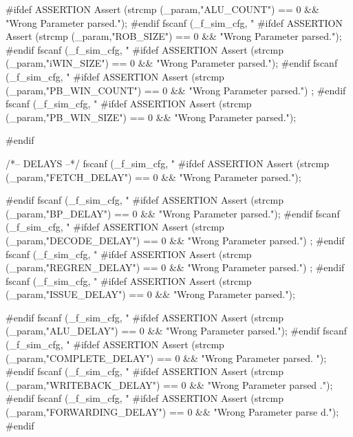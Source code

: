 \begin{DoxyCode}
{        #ifdef ASSERTION
        Assert (strcmp (_param,"ALU_COUNT") == 0 && "Wrong Parameter parsed.");
        #endif
        fscanf (_f_sim_cfg, "%
        #ifdef ASSERTION
        Assert (strcmp (_param,"ROB_SIZE") == 0 && "Wrong Parameter parsed.");
        #endif
        fscanf (_f_sim_cfg, "%
        #ifdef ASSERTION
        Assert (strcmp (_param,"iWIN_SIZE") == 0 && "Wrong Parameter parsed.");
        #endif
        fscanf (_f_sim_cfg, "%
        #ifdef ASSERTION
        Assert (strcmp (_param,"PB_WIN_COUNT") == 0 && "Wrong Parameter parsed.")
      ;
        #endif
        fscanf (_f_sim_cfg, "%
        #ifdef ASSERTION
        Assert (strcmp (_param,"PB_WIN_SIZE") == 0 && "Wrong Parameter parsed.");
      
        #endif

        /*-- DELAYS --*/
        fscanf (_f_sim_cfg, "%
        #ifdef ASSERTION
        Assert (strcmp (_param,"FETCH_DELAY") == 0 && "Wrong Parameter parsed.");
      
        #endif
        fscanf (_f_sim_cfg, "%
        #ifdef ASSERTION
        Assert (strcmp (_param,"BP_DELAY") == 0 && "Wrong Parameter parsed.");
        #endif
        fscanf (_f_sim_cfg, "%
        #ifdef ASSERTION
        Assert (strcmp (_param,"DECODE_DELAY") == 0 && "Wrong Parameter parsed.")
      ;
        #endif
        fscanf (_f_sim_cfg, "%
        #ifdef ASSERTION
        Assert (strcmp (_param,"REGREN_DELAY") == 0 && "Wrong Parameter parsed.")
      ;
        #endif
        fscanf (_f_sim_cfg, "%
        #ifdef ASSERTION
        Assert (strcmp (_param,"ISSUE_DELAY") == 0 && "Wrong Parameter parsed.");
      
        #endif
        fscanf (_f_sim_cfg, "%
        #ifdef ASSERTION
        Assert (strcmp (_param,"ALU_DELAY") == 0 && "Wrong Parameter parsed.");
        #endif
        fscanf (_f_sim_cfg, "%
        #ifdef ASSERTION
        Assert (strcmp (_param,"COMPLETE_DELAY") == 0 && "Wrong Parameter parsed.
      ");
        #endif
        fscanf (_f_sim_cfg, "%
        #ifdef ASSERTION
        Assert (strcmp (_param,"WRITEBACK_DELAY") == 0 && "Wrong Parameter parsed
      .");
        #endif
        fscanf (_f_sim_cfg, "%
        #ifdef ASSERTION
        Assert (strcmp (_param,"FORWARDING_DELAY") == 0 && "Wrong Parameter parse
      d.");
        #endif

}
\end{DoxyCode}

